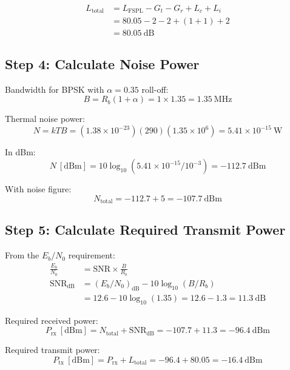 \begin{align}
L_{\text{total}} &= L_{\text{FSPL}} - G_t - G_r + L_c + L_i \\
&= 80.05 - 2 - 2 + (1 + 1) + 2 \\
&= 80.05\ \text{dB}
\end{align}

\subsection*{Step 4: Calculate Noise Power}

Bandwidth for BPSK with $\alpha = 0.35$ roll-off:
\begin{equation}
B = R_b(1 + \alpha) = 1 \times 1.35 = 1.35\ \text{MHz}
\end{equation}

Thermal noise power:
\begin{equation}
N = kTB = (1.38 \times 10^{-23})(290)(1.35 \times 10^6) = 5.41 \times 10^{-15}\ \text{W}
\end{equation}

In dBm:
\begin{equation}
N\ [\text{dBm}] = 10\log_{10}(5.41 \times 10^{-15} / 10^{-3}) = -112.7\ \text{dBm}
\end{equation}

With noise figure:
\begin{equation}
N_{\text{total}} = -112.7 + 5 = -107.7\ \text{dBm}
\end{equation}

\subsection*{Step 5: Calculate Required Transmit Power}

From the $E_b/N_0$ requirement:
\begin{align}
\frac{E_b}{N_0} &= \text{SNR} \times \frac{B}{R_b} \\
\text{SNR}_{\text{dB}} &= (E_b/N_0)_{\text{dB}} - 10\log_{10}(B/R_b) \\
&= 12.6 - 10\log_{10}(1.35) = 12.6 - 1.3 = 11.3\ \text{dB}
\end{align}

Required received power:
\begin{equation}
P_{\text{rx}}\ [\text{dBm}] = N_{\text{total}} + \text{SNR}_{\text{dB}} = -107.7 + 11.3 = -96.4\ \text{dBm}
\end{equation}

Required transmit power:
\begin{equation}
P_{\text{tx}}\ [\text{dBm}] = P_{\text{rx}} + L_{\text{total}} = -96.4 + 80.05 = -16.4\ \text{dBm}
\end{equation}

